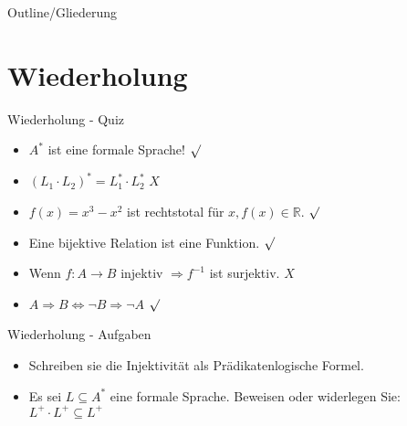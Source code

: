 
\subtitle{Foliensatz 4}
\date{15. November 2012}



\begin{frame}
    \titlepage
\end{frame}

\begin{frame}{Outline/Gliederung}
    \tableofcontents
\end{frame}


\section{Wiederholung} 
\begin{frame} {Wiederholung - Quiz}
    \begin{itemize}
        \item $A^*$ ist eine formale Sprache! 
         {\color{darkgreen}$\surd$}\\
        \color{black}
        \item $(L_1 \cdot L_2)^* = L_1^* \cdot L_2^*$
         {\color{red}$X$}\\
        \color{black}
        \item $f(x) = x^3-x^2$ ist rechtstotal für $x, f(x) \in \mathbb{R}$.
         {\color{darkgreen}$\surd$}\\
        \color{black}
        \item Eine bijektive Relation ist eine Funktion.
         {\color{darkgreen}$\surd$}\\
        \color{black}
        \item Wenn $f: A \rightarrow B$ injektiv $\Rightarrow f^{-1}$ ist surjektiv.
         {\color{red}$X$}\\
        \color{black}
        \item $A\Rightarrow B \Leftrightarrow \neg B \Rightarrow \neg A$
         {\color{darkgreen}$\surd$}\\
    \end{itemize}
\end{frame}



\begin{frame} {Wiederholung - Aufgaben}
    \begin{itemize}
        \item Schreiben sie die Injektivität als Prädikatenlogische Formel.
        \pause
        \item Es sei $L \subseteq A^*$ eine formale Sprache. Beweisen oder widerlegen Sie:\\
        $L^+ \cdot L^+ \subseteq L^+$
    \end{itemize}
\end{frame}

